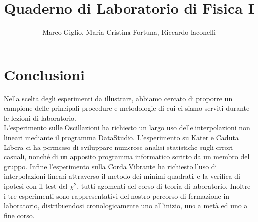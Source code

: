 \documentclass[a4paper,10pt]{report}
\author{Marco Giglio, Maria Cristina Fortuna, Riccardo Iaconelli}
\title{Quaderno di Laboratorio di Fisica I}
\begin{document}
\maketitle


%
%

%
%

%
%

%
\chapter*{Conclusioni}
Nella scelta degli esperimenti da illustrare, abbiamo cercato di proporre un campione delle principali procedure e metodologie di cui ci siamo serviti durante le lezioni di laboratorio.\\
L'esperimento sulle Oscillazioni ha richiesto un largo uso delle interpolazioni non lineari mediante il programma DataStudio.
L'esperimento su Kater e Caduta Libera ci ha permesso di sviluppare numerose analisi statistiche sugli errori casuali, nonché di un apposito programma informatico scritto da un membro del gruppo.
Infine l'esperimento sulla Corda Vibrante ha richiesto l'uso di interpolazioni lineari attraverso il metodo dei minimi quadrati, e la verifica di ipotesi con il test del $\chi^2$, tutti agomenti del corso di teoria di laboratorio.
Inoltre i tre esperimenti sono rappresentativi del nostro percorso di formazione in laboratorio, distribuendosi cronologicamente uno all'inizio, uno a metà ed uno a fine corso.   
\end{document}
